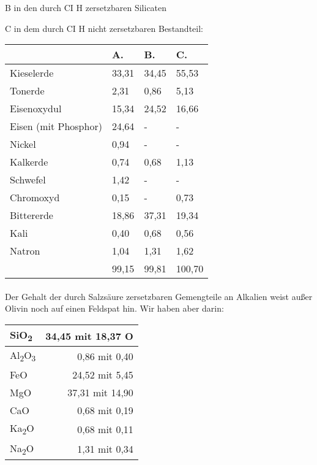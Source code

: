 \documentclass[a4paper, 11pt, oneside]{article}
\begin{document}
B in den durch CI H zersetzbaren Silicaten

C in dem durch CI H nicht zersetzbaren Bestandteil:
\begin{center}
\begin{tabular}{ |p{35mm}|p{20mm}|p{20mm}|p{20mm}| }
    \hline
    & A. & B. & C.\\
    \hline\hline
    Kieselerde & 33,31 & 34,45 & 55,53\\\hline
    Tonerde & 2,31 & 0,86 & 5,13\\\hline
    Eisenoxydul & 15,34 & 24,52 & 16,66\\\hline
    Eisen (mit Phosphor) & 24,64 & - & -\\\hline
    Nickel & 0,94 & - & -\\\hline
    Kalkerde & 0,74 & 0,68 & 1,13\\\hline
    Schwefel & 1,42 & - & -\\\hline
    Chromoxyd & 0,15 & - & 0,73\\\hline
    Bittererde & 18,86 & 37,31 & 19,34\\\hline
    Kali & 0,40 & 0,68 & 0,56\\\hline
    Natron & 1,04 & 1,31 & 1,62\\\hline
    & 99,15 & 99,81 & 100,70\\
    \hline
\end{tabular}
\end{center}
\paragraph{}
Der Gehalt der durch Salzsäure zersetzbaren Gemengteile an Alkalien weist außer Olivin noch auf einen Feldspat hin. Wir haben aber darin:
\begin{center}
    \begin{tabular}{ |l|r| } 
    \hline
    SiO\textsubscript{2} & 34,45 mit 18,37 O\\\hline
    Al\textsubscript{2}O\textsubscript{3} & 0,86 mit 0,40\\\hline
    FeO & 24,52 mit 5,45\\\hline
    MgO & 37,31 mit 14,90\\\hline
    CaO & 0,68 mit 0,19\\\hline
    Ka\textsubscript{2}O & 0,68 mit 0,11\\\hline
    Na\textsubscript{2}O & 1,31 mit 0,34\\
    \hline
    \end{tabular}
\end{center}
\end{document}
